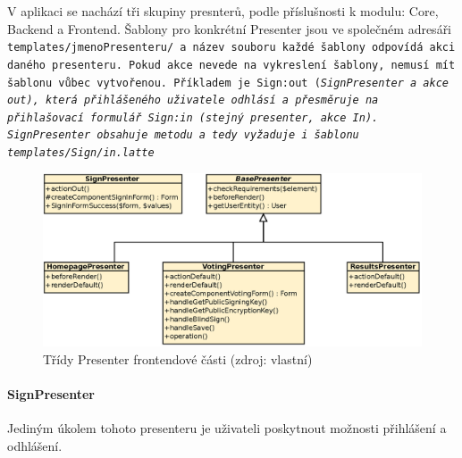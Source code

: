 V aplikaci se nachází tři skupiny presnterů, podle příslušnosti k modulu: Core, Backend a Frontend. Šablony pro konkrétní Presenter jsou ve společném adresáři \tt{templates/jmenoPresenteru/} a název souboru každé šablony odpovídá akci daného presenteru. Pokud akce nevede na vykreslení šablony, nemusí mít šablonu vůbec vytvořenou. Příkladem je \tt{Sign:out} (\it{SignPresenter} a akce \it{out}), která přihlášeného uživatele odhlásí a přesměruje na přihlašovací formulář \tt{Sign:in} (stejný presenter, akce \textit{In}). SignPresenter obsahuje metodu  a tedy vyžaduje i šablonu \tt{templates/Sign/in.latte}


\begin{figure}[h]
	\centering
	\includegraphics[width=\linewidth]{svg/frontendPresenters.eps}
	\captionsetup{width=\linewidth}
	\caption[Třídy Presenter frontendové části]{Třídy Presenter frontendové části (zdroj: vlastní)}
	\label{fig:FrontendPresenters}
\end{figure}
\clearpage
\paragraph{SignPresenter} Jediným úkolem tohoto presenteru je uživateli poskytnout možnosti přihlášení a odhlášení.


